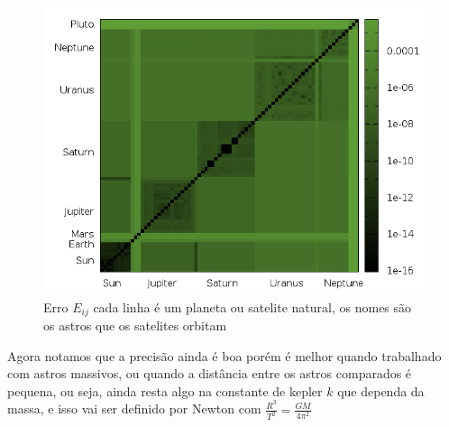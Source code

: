 \documentclass[a4paper,12pt]{exam}
\begin{document}
	\begin{figure}[h]
		\centering
		\includegraphics[scale=0.6]{8o1.png}
		\caption{ Erro $E_{ij}$ cada linha é um planeta ou satelite natural, os nomes são os astros que os satelites orbitam}
	\end{figure}
	
	Agora notamos que a precisão ainda é boa porém é melhor quando trabalhado com astros massivos, ou quando a distância entre os astros comparados é pequena, ou seja, ainda resta algo na constante de kepler $k$ que dependa da massa, e isso vai ser definido por Newton com $\frac{R^3}{T^2} = \frac{GM}{4 \pi^2}$
	
	
	
\end{document}
